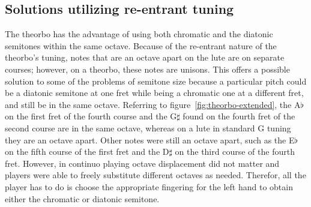 \subsection{Solutions utilizing re-entrant tuning}

The theorbo has the advantage of using both chromatic and the diatonic semitones within
the same octave.  Because of the re-entrant nature of the theorbo's tuning, notes that
are an octave apart on the lute are on separate courses; however, on a theorbo, these
notes are unisons. This offers a possible solution to some of the problems of semitone
size because a particular pitch could be a diatonic semitone at one fret while being a
chromatic one at a different fret, and still be in the same octave. Referring to
figure~\ref{fig:theorbo-extended}, the A$\flat$ on the first fret of the fourth course
and the G$\sharp$ found on the fourth fret of the second course are in the same octave,
whereas on a lute in standard G tuning they are an octave apart. Other notes were still
an octave apart, such as the E$\flat$ on the fifth course of the first fret and the
D$\sharp$ on the third course of the fourth fret.  However, in continuo playing octave
displacement did not matter and players were able to freely substitute different
octaves as needed. Therefor,  all the player has to do is choose the appropriate
fingering for the left hand to obtain either the chromatic or diatonic semitone.

